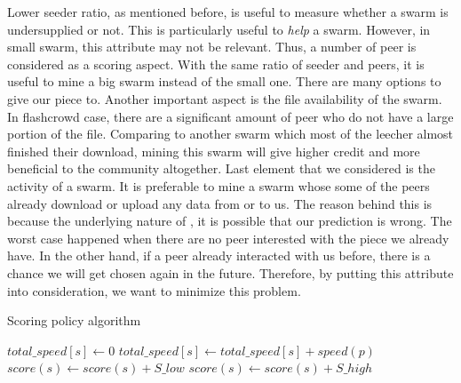 Lower seeder ratio, as mentioned before, is useful to measure whether a swarm is undersupplied or not. This is particularly useful to \textit{help} a swarm. However, in small swarm, this attribute may not be relevant. Thus, a number of peer is considered as a scoring aspect. With the same ratio of seeder and peers, it is useful to mine a big swarm instead of the small one. There are many options to give our piece to. Another important aspect is the file availability of the swarm. In flashcrowd case, there are a significant amount of peer who do not have a large portion of the file. Comparing to another swarm which most of the leecher almost finished their download, mining this swarm will give higher credit and more beneficial to the community altogether. Last element that we considered is the activity of a swarm. It is preferable to mine a swarm whose some of the peers already download or upload any data from or to us. The reason behind this is because the underlying nature of \bt, it is possible that our prediction is wrong. The worst case happened when there are no peer interested with the piece we already have. In the other hand, if a peer already interacted with us before, there is a chance we will get chosen again in the future. Therefore, by putting this attribute into consideration, we want to minimize this problem.

\begin{algorithm}[th]
	\caption{Scoring policy algorithm}
	\label{alg:scorep}
	\begin{algorithmic}[1]
		\Statex
		\Statex
						\State $total\_speed[s] \gets 0$
				\State $total\_speed[s] \gets total\_speed[s] + speed(p)$
			\EndFor
		\EndFor
		\State {}
				\State $score(s) \gets score(s) + S\_low$
			\Else{\null}
				\State $score(s) \gets score(s) + S\_high$
			\EndIf
		\EndFor
		\State {}
	\end{algorithmic}
\end{algorithm}

